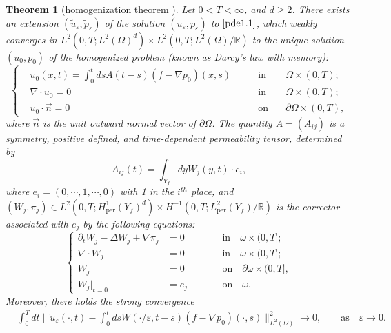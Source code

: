 \documentclass[13pt,CJK]{article}
\theoremstyle{plain}                       %
\newtheorem{theorem}[lemma]{Theorem}
\theoremstyle{remark}
\numberwithin{equation}{section}
\begin{document}
\begin{theorem}[homogenization theorem \cite{Allaire92,Allaire-Mikelic97,Lions81,Mikelic94,Sandrakov97}]
\label{thm3}
Let $0<T<\infty$, and $d\geq 2$. There exists an extension $(\tilde{u}_\varepsilon,\tilde{p}_\varepsilon)$ of the solution $(u_\varepsilon,p_\varepsilon)$ to $\eqref{pde1.1}$, which
weakly converges in $L^2(0,T;L^2(\Omega)^d)\times
L^2(0,T;L^2(\Omega)/\mathbb{R})$ to the unique solution
$(u_0,p_0)$ of the homogenized problem (known as Darcy's law with memory):
\begin{equation}\label{pde1.2}
\left\{
\begin{aligned}
&u_0(x,t)=\int_{0}^tds A(t-s)(f-\nabla p_0)(x,s)\qquad&\text{in}&\quad\Omega\times(0,T);\\
&\nabla\cdot u_0=0\qquad&\text{in}&\quad\Omega\times(0,T);\\
&u_0\cdot \vec{n}=0\qquad&\text{on}&\quad\partial\Omega\times (0,T),
\end{aligned}
\right.
\end{equation}
where $\vec{n}$ is the unit outward normal vector of $\partial\Omega$.
The quantity $A=(A_{ij})$ is a symmetry, positive defined,
and time-dependent
permeability tensor,  determined by
\begin{equation}\label{pde2.2}
  A_{ij}(t)=\int_{Y_f}dy W_j(y,t)\cdot e_i,
\end{equation}
where $e_{i}=(0,\cdots,1,\cdots,0)$ with 1 in the $i^{th}$ place,
and $(W_{j},\pi_{j})\in
L^2(0,T;H^{1}_{\text{per}}(Y_f)^d)\times
H^{-1}
({0,T;L^2_{\text{per}}(Y_f)}/\mathbb{R})$ is the corrector associated with $e_j$ by the following equations:
\begin{equation}\label{pde2.1}
\left\{
\begin{aligned}
\partial_t W_j-\Delta W_{j}+
\nabla \pi_{j}&=0&\qquad&\text{in}\quad
\omega\times(0,T];\\
\nabla\cdot W_j&=0&\qquad&\text{in}\quad
\omega\times(0,T];\\
W_j&=0&\qquad&\text{on}\quad\partial\omega
\times(0,T],\\
W_j|_{t=0}&=e_j&\qquad&\text{on}\quad\omega.
\end{aligned}\right.
\end{equation}
Moreover, there holds the strong convergence 
\begin{equation}\label{pri:1.2}
\begin{aligned}
& \int_{0}^{T}dt\big\|\tilde{u}_\varepsilon(\cdot,t)
    -\int_{0}^{t}ds W(\cdot/\varepsilon,t-s)(f-\nabla p_0)(\cdot,s)\big\|_{L^2(\Omega)}^2
  \to 0,\qquad\text{as}\quad \varepsilon\to 0.
\end{aligned}
\end{equation}
\end{theorem}
\end{document}
